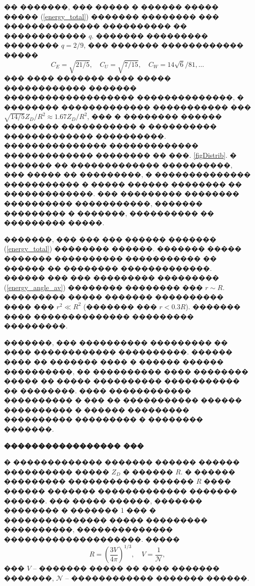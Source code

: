 \documentclass[12pt,titlepage]{article}
\begin{document}
�� �������, ��� ����� � ������ ����� ����� (\ref{energy_total}) ������� �������� ��� �������������� ���������� �� ������������ $q$. ������� ��������� �������� $q = 2/9$, ��� ������� ������������ �����
\begin{equation}
    C_E = \sqrt{ 21/5 }, \quad C_U = \sqrt{ 7/15 }, \quad C_W = 14 \sqrt{6}/81, \ldots
\end{equation}
��� ���� ������� ���� ����� ������������ ������� ������������������� ��������������, � �������� ������������� ����������� ��� $\sqrt{14/5} Z_D/R^2 \approx 1.67 Z_D/R^2$, ��� � �������� ������ �������� ����������� � ���������� ������������� ����������. ��������������� ������������� ������������� �������� �� ���. \ref{figDistrib}. � ������� �� ������������� ����������, ��� ����� �� ���������, � �������������� ����������� � ����� ������ �������� �� �������������. ��� ��������� �������� ���������� �����������, ������� ��������� � �������, ���������� �� ��������� �����.

�������, ��� ��� ��� ������ ������� (\ref{energy_total}) �������� ������. ������� ����� ������� ���������� ����������� �� ������ �� �������� �������������. ������ ��� ��� ��������� ��������� (\ref{energy_angle_av}) �������� �������� ��� $r \sim R$. ��������� ����� ������� ���������� ���� ��� $r^2 \ll R^2$ (������� ��� $r < 0.3 R$). ������� ���� �������������� ��������� ���������.

�������, ��� ���������� ��������� �� ���� ������������ ����������. ������ ���� �� ������� ���� � ������ ������ ����������, �� ���������� ���� �������� ����� �� ����� ���������� ����������� �� ��������. ���� ������������ ���������� � ��� �� ����������� ������ ���������� � ������ ��������� ���������� ��������� � �������� �������.

\bigskip

\textbf{����������������� ���}

� ������������� ������� ������ ������ ���������� ����� $Z_D$ � ������ $R$. � ������ ��������� ������������ ������ $R$ ���� ������ ������� ������������� ������� ������. ��� ����� ������, ������� �������� � ������� 1 ��� � ��������������� ����� ��������� ����������, �������������� ��������������������. �����
\begin{equation}
    R = \left( \frac{3 V}{4\pi} \right)^{1/3}, \quad V = \frac{1}{\mathcal{N}},
\end{equation}
��� $V$ -- ������� ����� �� ���� ������� �������, $\mathcal{N}$ -- ������������ ������� ������.
\end{document}
